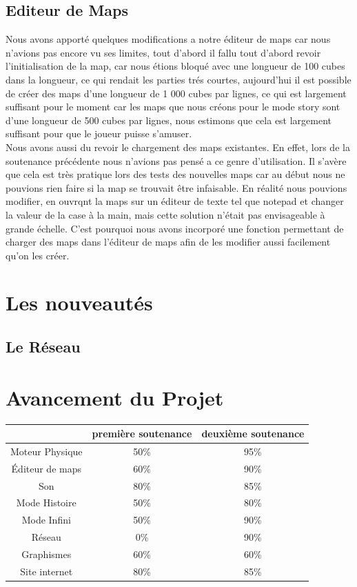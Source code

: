 \documentclass [11pt]{report}
\begin{document}
		\vspace{10mm}
		
	\section{Editeur de Maps}
		Nous avons apporté quelques modifications a notre éditeur de maps car nous n'avions pas encore vu ses limites, tout d'abord il fallu tout d'abord revoir l'initialisation de la map, car nous étions bloqué avec une longueur de 100 cubes dans la longueur, ce qui rendait les parties trés courtes, aujourd'hui il est possible de créer des maps d'une longueur de 1 000 cubes par lignes, ce qui est largement suffisant pour le moment car les maps que nous créons pour le mode story sont d'une longueur de 500 cubes par lignes, nous estimons que cela est largement suffisant pour que le joueur puisse s'amuser.\\
				
		\indent Nous avons aussi du revoir le chargement des maps existantes. En effet, lors de la soutenance précédente nous n'avions pas pensé a ce genre d'utilisation. Il s'avère que cela est très pratique lors des tests des nouvelles maps car au début nous ne pouvions rien faire si la map se trouvait \^etre infaisable. En réalité nous pouvions modifier, en ouvrqnt la maps sur un éditeur de texte tel que notepad et changer la valeur de la case \`a la main, mais cette solution n'était pas envisageable \`a grande échelle. C'est pourquoi nous avons incorporé une fonction permettant de charger des maps dans l'éditeur de maps afin de les modifier aussi facilement qu'on les créer.
		
		\vspace{10mm}
		
\chapter{Les nouveautés}
	\section{Le Réseau}
	
\chapter{Avancement du Projet}
	\renewcommand{\arraystretch}{2}
	\setlength{\tabcolsep}{0.7cm}
	\begin{tabular}{|c|c|c|}
	\hline  & premi\`ere soutenance & deuxi\`eme soutenance\\ 
	\hline Moteur Physique & 50\% & 95\% \\ 
	\hline \'Editeur de maps & 60\% & 90\% \\ 
	\hline Son & 80\% & 85\% \\ 
	\hline Mode Histoire & 50\% &  80\%\\ 
	\hline Mode Infini & 50\% & 90\% \\ 
	\hline Réseau &  0\% & 90\% \\ 
	\hline Graphismes & 60\% & 60\% \\ 
	\hline Site internet & 80\% & 85\% \\ 
	\hline
	\end{tabular} 
	
\end{document}
